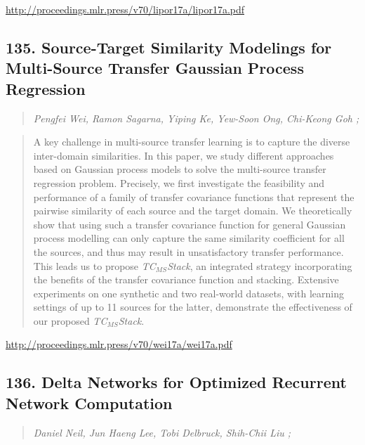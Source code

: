 \documentclass{article}
\begin{document}
\href{http://proceedings.mlr.press/v70/lipor17a/lipor17a.pdf}{http://proceedings.mlr.press/v70/lipor17a/lipor17a.pdf}

\subsection{135. Source-Target Similarity Modelings for Multi-Source Transfer Gaussian Process Regression}

\begin{quote}
\footnotesize{\textit{Pengfei Wei, Ramon Sagarna, Yiping Ke, Yew-Soon Ong, Chi-Keong Goh ;}}
\end{quote}

\begin{quote}
    A key challenge in multi-source transfer learning is to capture the diverse inter-domain similarities. In this paper, we study different approaches based on Gaussian process models to solve the multi-source transfer regression problem. Precisely, we first investigate the feasibility and performance of a family of transfer covariance functions that represent the pairwise similarity of each source and the target domain. We theoretically show that using such a transfer covariance function for general Gaussian process modelling can only capture the same similarity coefficient for all the sources, and thus may result in unsatisfactory transfer performance. This leads us to propose \textit{TC$_{MS}$Stack}, an integrated strategy incorporating the benefits of the transfer covariance function and stacking. Extensive experiments on one synthetic and two real-world datasets, with learning settings of up to 11 sources for the latter, demonstrate the effectiveness of our proposed \textit{TC$_{MS}$Stack}.  \end{quote}

\href{http://proceedings.mlr.press/v70/wei17a/wei17a.pdf}{http://proceedings.mlr.press/v70/wei17a/wei17a.pdf}

\subsection{136. Delta Networks for Optimized Recurrent Network Computation}

\begin{quote}
\footnotesize{\textit{Daniel Neil, Jun Haeng Lee, Tobi Delbruck, Shih-Chii Liu ;}}
\end{quote}
\end{document}
